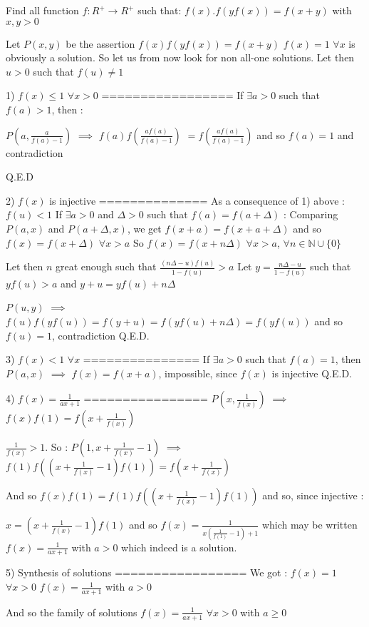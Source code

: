 \begin{solution}
	\begin{tcolorbox}Find all function $f:R^{+}\rightarrow R^{+}$ such that: $f(x).f(yf(x))=f(x+y)$ with $x,y>0$\end{tcolorbox}

Let $P(x,y)$ be the assertion $f(x)f(yf(x))=f(x+y)$
$f(x)=1$ $\forall x$ is obviously a solution. So let us from now look for non all-one solutions.
Let then $u>0$ such that $f(u)\ne 1$


1) $f(x)\le 1$ $\forall x>0$
=================
If $\exists a>0$ such that $f(a)>1$, then :

$P(a,\frac{a}{f(a)-1})$ $\implies$ $f(a)f(\frac{af(a)}{f(a)-1})$ $=f(\frac{af(a)}{f(a)-1})$ and so $f(a)=1$ and contradiction

Q.E.D

2) $f(x)$ is injective
==============
As a consequence of 1) above : $f(u)<1$
If $\exists a>0$ and $\Delta>0$ such that $f(a)=f(a+\Delta)$ :
Comparing $P(a,x)$ and $P(a+\Delta,x)$, we get $f(x+a)=f(x+a+\Delta)$ and so $f(x)=f(x+\Delta)$ $\forall x>a$
So $f(x)=f(x+n\Delta)$ $\forall x>a$, $\forall n\in\mathbb N\cup\{0\}$

Let then $n$ great enough such that $\frac{(n\Delta-u)f(u)}{1-f(u)}>a$
Let $y=\frac{n\Delta-u}{1-f(u)}$ such that $yf(u)>a$ and $y+u=yf(u)+n\Delta$

$P(u,y)$ $\implies$ $f(u)f(yf(u))=f(y+u)=f(yf(u)+n\Delta)=f(yf(u))$ and so $f(u)=1$, contradiction
Q.E.D.

3) $f(x)<1$ $\forall x$
===============
If $\exists a>0$ such that $f(a)=1$, then $P(a,x)$ $\implies$ $f(x)=f(x+a)$, impossible, since $f(x)$ is injective
Q.E.D.

4) $f(x)=\frac 1{ax+1}$
================
$P(x,\frac 1{f(x)})$ $\implies$ $f(x)f(1)=f(x+\frac 1{f(x)})$

$\frac 1{f(x)}>1$. So : $P(1,x+\frac 1{f(x)}-1)$ $\implies$ $f(1)f((x+\frac 1{f(x)}-1)f(1))=f(x+\frac 1{f(x)})$

And so $f(x)f(1)=f(1)f((x+\frac 1{f(x)}-1)f(1))$ and so, since injective :

$x=(x+\frac 1{f(x)}-1)f(1)$ and so $f(x)=\frac 1{x(\frac 1{f(1)}-1)+1}$ which may be written $f(x)=\frac 1{ax+1}$ with $a>0$
which indeed is a solution.

5) Synthesis of solutions
=================
We got :
$f(x)=1$ $\forall x>0$
$f(x)=\frac 1{ax+1}$ with $a>0$

And so the family of solutions $\boxed{f(x)=\frac 1{ax+1}}$ $\forall x>0$ with $a\ge 0$
\end{solution}



